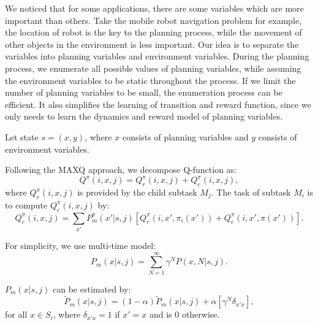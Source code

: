 \documentclass{article} %
\begin{document}
We noticed that for some applications, there are some variables which are more important
than others. Take the mobile robot navigation problem for example, the location of robot 
is the key to the planning process, while the movement of other objects in the environment is less important.
Our idea is to separate the variables into planning variables 
and environment variables. During the planning process, we enumerate all possible values of planning variables, while assuming 
the environment variables to be static throughout the process. 
If we limit the number of planning variables to be small, the enumeration process can be efficient.
It also simplifies the learning of transition and reward function, since we only needs to learn
the dynamics and reward model of planning variables.

Let state $s = (x, y)$, where $x$ consists of planning variables and $y$ consists of environment
variables. 


Following the MAXQ approach, we decompose Q-function as:
\begin{equation}
    Q^{\pi}(i, x, j) = Q_r^{\pi}(i, x, j) + Q_c^{\pi}(i, x, j),
    \label{eq:biasedMaxQ}
\end{equation}
where $Q_r^{\pi}(i, x, j)$ is provided by the child subtask $M_j$.
The task of subtask $M_i$ is to compute $Q_c^{\pi}(i, x, j)$ by:
\begin{equation}
    Q_c^{\pi}(i, x, j) = \sum_{x'} P_m^{\pi}(x'|s, j)[Q_r^{\pi}(i, x', \pi_i(x')) + Q_c^{\pi}(i, x', \pi(x'))].
    \label{eq:biasedQc}
\end{equation}

For simplicity, we use multi-time model\cite{SMDP}: 
\begin{equation}
    P_m(x|s, j) = \sum^{\infty}_{N=1} \gamma^N P(x, N|s, j).
    \label{eq:multiProb}
\end{equation}

$P_m(x|s, j)$ can be estimated by:
\begin{equation}
    \tilde{P}_m(x|s, j) = (1-\alpha)\tilde{P}_m(x|s, j) + \alpha [ \gamma^N \delta_{x'x}],
    \label{eq:approxP}
\end{equation}
for all $x \in S_i$, where $\delta_{x'x}=1$ if $x' = x$ and is 0 otherwise.
\end{document}
